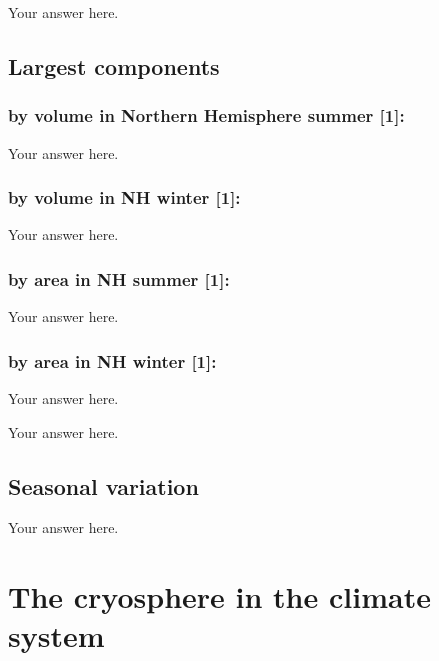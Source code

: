 \documentclass[Afour,times]{SIOpset}
\begin{document}
Your answer here.

\subsection{Largest components}

\subsubsection{by volume in Northern Hemisphere summer [1]:}

Your answer here.

\subsubsection{by volume in NH winter [1]:}

Your answer here.

\subsubsection{by area in NH summer [1]:}

Your answer here.

\subsubsection{by area in NH winter [1]:}

Your answer here.

\medskip
{}

Your answer here.

\subsection{Seasonal variation}

Your answer here. 

\section{The cryosphere in the climate system}
\end{document}
